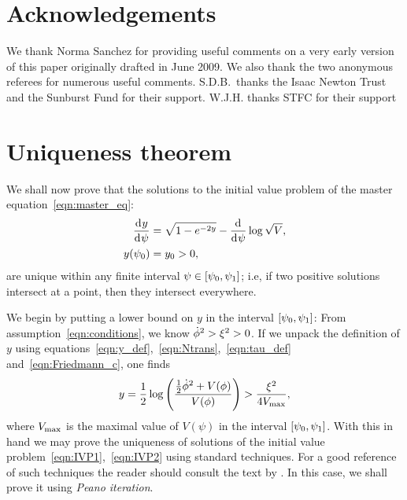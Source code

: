 \section*{Acknowledgements}
We thank Norma Sanchez for providing useful comments on a very early version of this paper originally drafted in June 2009. We also thank the two anonymous referees for numerous useful comments. S.D.B.\ thanks the Isaac Newton Trust and the Sunburst Fund for their support. W.J.H.  thanks STFC for their support




\section{Uniqueness theorem}
\label{sec:uniqueness_theorem}
We shall now prove that the solutions to the initial value problem of the master equation~\eqref{eqn:master_eq}:
%
\begin{align}
  \frac{\operatorname{d}^{}\!{y}}{\operatorname{d}^{}\!{\psi}}
  &=
  \sqrt{1-e^{-2y}} - \frac{\operatorname{d}^{}\!{}}{\operatorname{d}^{}\!{\psi}}\log \sqrt V,
  \label{eqn:IVP1}
  \\
  y(\psi_0)
  &=
  y_0>0
  \label{eqn:IVP2},
\end{align}
%
are unique within any finite interval $\psi\in[\psi_0,\psi_1]$; i.e, if two positive solutions intersect at a point, then they intersect
everywhere.

We begin by putting a lower bound on $y$ in the interval $[\psi_0,\psi_1]$: From assumption~\eqref{eqn:conditions}, we know $\dot{\phi}^2>\xi^2>0$. If we unpack the definition of $y$ using equations~\eqref{eqn:y_def},~\eqref{eqn:Ntrans},~\eqref{eqn:tau_def} and~\eqref{eqn:Friedmann_c}, one finds
%
\begin{equation}
  y 
  = 
  \frac{1}{2}\log
  \left(\frac{\frac{1}{2}\dot{\phi}^2 + V(\phi)}{V(\phi)}\right) 
  > 
  \frac{\xi^2}{4V_\mathrm{max}},
\end{equation}
%
where $V_\mathrm{max}$ is the maximal value of $V(\psi)$ in the interval $[\psi_0,\psi_1]$. With this in hand we may prove the uniqueness of solutions of the initial value problem~\eqref{eqn:IVP1},~\eqref{eqn:IVP2} using standard techniques. For a good reference of such techniques the reader should consult the text by \citet{agarwal_1993}. In this case, we shall prove it using {\em Peano iteration}.


